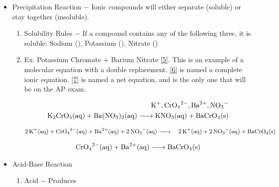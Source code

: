 \documentclass[12pt]{article}
\begin{document}
\begin{itemize}
  \item Precipitation Reaction $-$ Ionic compounds will either separate (soluble) or stay together (insoluble).

    \begin{enumerate}

      \item Solubility Rules $-$ If a compound contains any of the following three, it is soluble: Sodium (), Potassium (), Nitrate ()

      \item Ex. Potassium Chromate + Barium Nitrate \eqref{5}. This is an example of a molecular equation with a double replacement. \eqref{6} is named a complete ionic equation. \eqref{7} is named a net equation, and is the only one that will be on the AP exam.

        \begin{equation}
          \begin{split}
            \ce{K+}, \ce{CrO4^2-}, \ce{Ba^2+}, \ce{NO3-}\\
            \ce{K2CrO4(aq) + Ba(NO3)2(aq) -> KNO3(aq) + BaCrO4(s)}\\
          \end{split}
          \label{5}
        \end{equation}

        \begin{equation}
          \begin{split}
          \ce{2K+(aq) + CrO4^2-(aq) +  Ba^2+(aq) + 2NO3-(aq) ->} & 
        & \ce{2K+(aq) + 2NO3-(aq) + BaCrO4(s)}\\
          \end{split}
          \label{6}
        \end{equation}

        \begin{equation}
          \begin{split}
            \ce{CrO4^2-(aq) +  Ba^2+(aq) -> BaCrO4(s)}\\
          \end{split}
          \label{7}
        \end{equation}

    \end{enumerate}

  \item Acid-Base Reaction

    \begin{enumerate}

      \item Acid $-$ Produces 


\end{enumerate}
\end{itemize}
\end{document}

